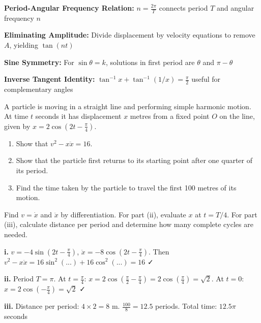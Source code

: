 \begin{takeaways}
\item \textbf{Period-Angular Frequency Relation:} $n = \frac{2\pi}{T}$ connects period $T$ and angular frequency $n$
\item \textbf{Eliminating Amplitude:} Divide displacement by velocity equations to remove $A$, yielding $\tan(nt)$
\item \textbf{Sine Symmetry:} For $\sin\theta = k$, solutions in first period are $\theta$ and $\pi - \theta$
\item \textbf{Inverse Tangent Identity:} $\tan^{-1}x + \tan^{-1}(1/x) = \frac{\pi}{2}$ useful for complementary angles
\end{takeaways}

\begin{problem}
A particle is moving in a straight line and performing simple harmonic motion. At time $t$ seconds it has displacement $x$ metres from a fixed point $O$ on the line, given by $x = 2 \cos \left( 2t - \frac{\pi}{4} \right)$.
\begin{enumerate}[label=\textbf{\roman*.}]
    \item Show that $v^2 - x\ddot{x} = 16$.
    \item Show that the particle first returns to its starting point after one quarter of its period.
    \item Find the time taken by the particle to travel the first 100 metres of its motion.
\end{enumerate}
\end{problem}

\begin{hint}
Find $v = \dot{x}$ and $\ddot{x}$ by differentiation. For part (ii), evaluate $x$ at $t = T/4$. For part (iii), calculate distance per period and determine how many complete cycles are needed.
\end{hint}

\begin{solution}
\textbf{i.} $v = -4\sin(2t - \frac{\pi}{4})$, $\ddot{x} = -8\cos(2t - \frac{\pi}{4})$. Then $v^2 - x\ddot{x} = 16\sin^2(...) + 16\cos^2(...) = 16$ ✓

\textbf{ii.} Period $T = \pi$. At $t = \frac{\pi}{4}$: $x = 2\cos(\frac{\pi}{2} - \frac{\pi}{4}) = 2\cos(\frac{\pi}{4}) = \sqrt{2}$. At $t=0$: $x = 2\cos(-\frac{\pi}{4}) = \sqrt{2}$ ✓

\textbf{iii.} Distance per period: $4 \times 2 = 8$ m. $\frac{100}{8} = 12.5$ periods. Total time: $12.5\pi$ seconds
\end{solution}

